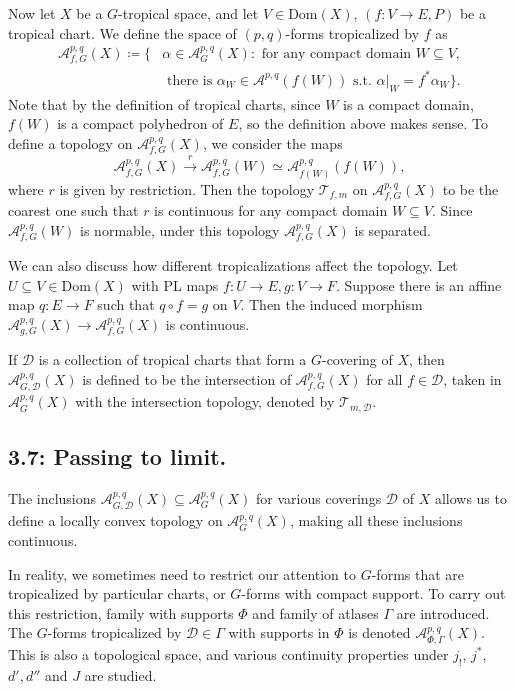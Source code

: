 \documentclass[12pt,reqno]{amsart}
\theoremstyle{definition}
\theoremstyle{remark}
\theoremstyle{citedrem}
\theoremstyle{cited}
\theoremstyle{citeddef}
\theoremstyle{step}
\begin{document}
Now let $X$ be a $G$-tropical space, and let $V \in \mathrm{Dom}(X)$, $(f\colon V \to E, P)$ be a tropical chart. We define the space of $(p,q)$-forms tropicalized by $f$ as
\begin{align*}\mathcal{A}^{p,q}_{f, G}(X) \coloneqq \{&\alpha \in \mathcal{A}^{p,q}_G(X) \colon \text{ for any compact domain }W \subseteq V,\\ &\text{ there is }\alpha_W \in \mathcal{A}^{p,q}(f(W)) \text{ s.t. } \alpha|_W = f^*\alpha_W\}.\end{align*}
Note that by the definition of tropical charts, since $W$ is a compact domain, $f(W)$ is a compact polyhedron of $E$, so the definition above makes sense. To define a topology on $\mathcal{A}^{p,q}_{f,G}(X)$, we consider the maps \[\mathcal{A}^{p,q}_{f,G}(X) \xrightarrow[]{r} \mathcal{A}^{p,q}_{f,G}(W) \simeq \mathcal{A}^{p,q}_{f(W)}(f(W)),\] where $r$ is given by restriction. Then the topology $\mathcal{T}_{f,m}$ on $\mathcal{A}^{p,q}_{f,G}(X)$ to be the coarest one such that $r$ is continuous for any compact domain $W \subseteq V$. Since $\mathcal{A}^{p,q}_{f,G}(W)$ is normable, under this topology $\mathcal{A}^{p,q}_{f,G}(X)$ is separated. 

We can also discuss how different tropicalizations affect the topology. Let $U \subseteq V \in \mathrm{Dom}(X)$ with PL maps $f\colon U \to E, g \colon V \to F$. Suppose there is an affine map $q \colon E \to F$ such that $q \circ f = g$ on $V$. Then the induced morphism $\mathcal{A}^{p,q}_{g,G}(X) \to \mathcal{A}^{p,q}_{f,G}(X)$ is continuous. 

If $\mathcal{D}$ is a collection of tropical charts that form a $G$-covering of $X$, then $\mathcal{A}^{p,q}_{G,\mathcal{D}}(X)$ is defined to be the intersection of $\mathcal{A}^{p,q}_{f,G}(X)$ for all $f \in \mathcal{D}$, taken in $\mathcal{A}^{p,q}_G(X)$ with the intersection topology, denoted by $\mathcal{T}_{m,\mathcal{D}}$. 

\subsection*{3.7: Passing to limit.}
The inclusions $\mathcal{A}^{p,q}_{G,\mathcal{D}}(X) \subseteq \mathcal{A}^{p,q}_G(X)$ for various coverings $\mathcal{D}$ of $X$ allows us to define a locally convex topology on $\mathcal{A}^{p,q}_G(X)$, making all these inclusions continuous. 

In reality, we sometimes need to restrict our attention to $G$-forms that are tropicalized by particular charts, or $G$-forms with compact support. To carry out this restriction, family with supports $\Phi$ and family of atlases $\Gamma$ are introduced. The $G$-forms tropicalized by $\mathcal{D} \in \Gamma$ with supports in $\Phi$ is denoted $\mathcal{A}^{p,q}_{\Phi, \Gamma}(X)$. This is also a topological space, and various continuity properties under $j_!$, $j^*$, $d', d''$ and $J$ are studied. 
\end{document}
